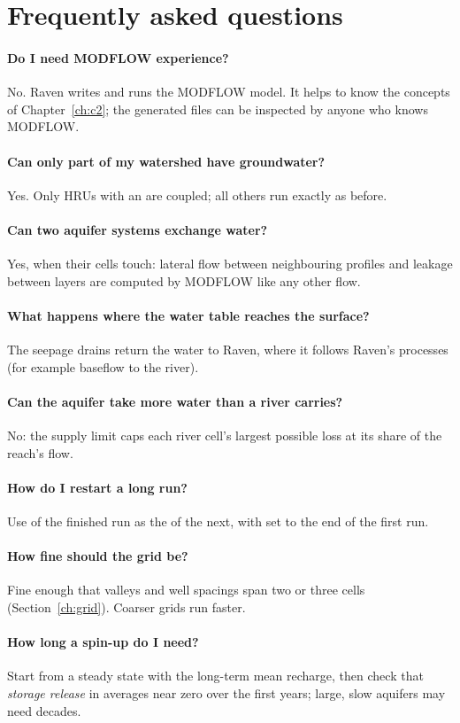 \section{Frequently asked questions}
\paragraph{Do I need MODFLOW experience?} No. Raven writes and runs the MODFLOW model. It helps to know the concepts of
Chapter~\ref{ch:c2}; the generated files can be inspected by anyone who knows MODFLOW.
\paragraph{Can only part of my watershed have groundwater?} Yes. Only HRUs with an  are coupled; all
others run exactly as before.
\paragraph{Can two aquifer systems exchange water?} Yes, when their cells touch: lateral flow between neighbouring profiles and
leakage between layers are computed by MODFLOW like any other flow.
\paragraph{What happens where the water table reaches the surface?} The seepage drains return the water to Raven, where it
follows Raven's processes (for example baseflow to the river).
\paragraph{Can the aquifer take more water than a river carries?} No: the supply limit caps each river cell's largest
possible loss at its share of the reach's flow.
\paragraph{How do I restart a long run?} Use  of the finished run as the  of the next, with
 set to the end of the first run.
\paragraph{How fine should the grid be?} Fine enough that valleys and well spacings span two or three cells
(Section~\ref{ch:grid}). Coarser grids run faster.
\paragraph{How long a spin-up do I need?} Start from a steady state with the long-term mean recharge, then check that
\emph{storage release} in  averages near zero over the first years; large, slow aquifers may need decades.
